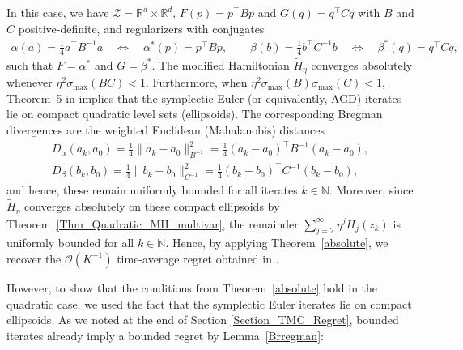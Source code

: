 \documentclass[11pt]{article}
\newcommand{\Z}{\mathcal{Z}}
\newcommand{\N}{\mathbb{N}}
\begin{document}
In this case, we have $\Z=\mathbb{R}^{d}\times\mathbb{R}^{d}$, $F(p)=p^{\top}Bp$ and $G(q)=q^{\top}Cq$ with $B$ and $C$ positive-definite, and regularizers with conjugates
\begin{gather*}
    \alpha(a)=\frac{1}{4}a^{\top}B^{-1}a \quad \Longleftrightarrow \quad \alpha^{*}(p)=p^{\top}Bp,
\qquad
\beta(b)=\frac{1}{4}b^{\top}C^{-1}b \quad \Longleftrightarrow \quad \beta^{*}(q)=q^{\top}Cq,
\end{gather*}
such that $F=\alpha^{*}$ and $G=\beta^{*}$. The modified Hamiltonian $\widetilde{H}_{\eta}$ converges absolutely whenever $\eta^{2}\sigma_{\max}(BC) < 1$. Furthermore, when $\eta^{2}\sigma_{\max}(B)\sigma_{\max}(C)<1$, Theorem~5 in \cite{pmlr-v125-bailey20a} implies that the symplectic Euler (or equivalently, AGD) iterates lie on compact quadratic level sets (ellipsoids). The corresponding Bregman divergences are the weighted Euclidean (Mahalanobis) distances
\begin{gather*}
    D_{\alpha}(a_{k},a_{0})=\frac{1}{4}\|a_{k}-a_{0}\|_{B^{-1}}^{2}=\frac{1}{4}(a_{k}-a_{0})^{\top}B^{-1}(a_{k}-a_{0}),\\
    D_{\beta}(b_{k},b_{0})=\frac{1}{4}\|b_{k}-b_{0}\|_{C^{-1}}^{2}=\frac{1}{4}(b_{k}-b_{0})^{\top}C^{-1}(b_{k}-b_{0}),
\end{gather*}
and hence, these remain uniformly bounded for all iterates $k\in\N$. Moreover, since $\widetilde{H}_{\eta}$ converges absolutely on these compact ellipsoids by Theorem~\ref{Thm_Quadratic_MH_multivar}, the remainder $\sum_{j=2}^{\infty}\eta^{j}H_{j}(z_{k})$ is uniformly bounded for all $k\in\mathbb{N}$. 
Hence, by applying Theorem~\ref{absolute}, we recover the $\mathcal{O}(K^{-1})$ time-average regret obtained in \cite{pmlr-v125-bailey20a}.  

However, to show that the conditions from Theorem~\ref{absolute} hold in the quadratic case, we used the fact that the symplectic Euler iterates lie on compact ellipsoids. As we noted at the end of Section \ref{Section_TMC_Regret}, bounded iterates already imply a bounded regret by Lemma~\ref{Brregman}:
\end{document}
